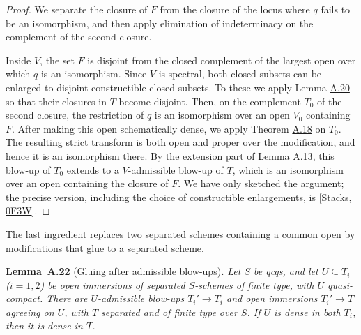 \documentclass[11pt]{article}
\newenvironment{bpstatement}[2]{\par\addvspace{0.6\baselineskip}\noindent\textbf{#1}#2\textbf{.}\enspace\ignorespaces}
  {\par\addvspace{0.4\baselineskip}}
\newenvironment{bpstatementit}[2]{\begin{bpstatement}{#1}{#2}\itshape\ignorespaces}{\end{bpstatement}}
\begin{document}
\begin{proof}[{Proof}]\label{bp56}%
We separate the closure of \(F\) from the closure of the locus where \(q\) fails to be an isomorphism, and then apply elimination of indeterminacy on the complement of the second closure.

Inside \(V\), the set \(F\) is disjoint from the closed complement of the largest open over which \(q\) is an isomorphism. Since \(V\) is spectral, both closed subsets can be enlarged to disjoint constructible closed subsets. To these we apply Lemma \hyperref[bp53]{A.20} so that their closures in \(T\) become disjoint. Then, on the complement \(T_0\) of the second closure, the restriction of \(q\) is an isomorphism over an open \(V_0\) containing \(F\). After making this open schematically dense, we apply Theorem \hyperref[bp46]{A.18} on \(T_0\). The resulting strict transform is both open and proper over the modification, and hence it is an isomorphism there. By the extension part of Lemma \hyperref[bp33]{A.13}, this blow-up of \(T_0\) extends to a \(V\)-admissible blow-up of \(T\), which is an isomorphism over an open containing the closure of \(F\). We have only sketched the argument; the precise version, including the choice of constructible enlargements, is [Stacks, \href{https://stacks.math.columbia.edu/tag/0F3W}{0F3W}].
\end{proof}

\label{bp57}%
The last ingredient replaces two separated schemes containing a common open by modifications that glue to a separated scheme.

\label{bp58}%
\begin{bpstatementit}{Lemma~A.22}{ (Gluing after admissible blow-ups)}
Let \(S\) be qcqs, and let \(U\subseteq T_i\) (\(i=1,2\)) be open immersions of separated \(S\)-schemes of finite type, with \(U\) quasi-compact. There are \(U\)-admissible blow-ups \(T_i'\to T_i\) and open immersions \(T_i'\to T\) agreeing on \(U\), with \(T\) separated and of finite type over \(S\). If \(U\) is dense in both \(T_i\), then it is dense in \(T\).
\end{bpstatementit}
\end{document}
